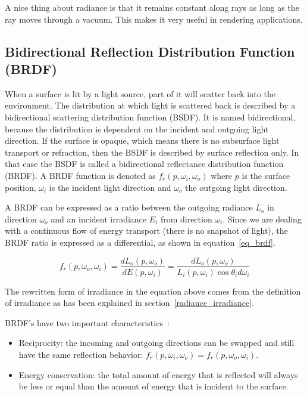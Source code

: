 \documentclass[11pt,a4paper]{report}
\begin{document}
A nice thing about radiance is that it remains constant along rays as long as the ray moves through a vacuum. This makes it very useful in rendering applications.

\subsection{Bidirectional Reflection Distribution Function (BRDF)}
\label{sec_bsdf}

When a surface is lit by a light source, part of it will scatter back into the environment. The distribution at which light is scattered back is described by a bidirectional scattering distribution function (BSDF). It is named bidirectional, because the distribution is dependent on the incident and outgoing light direction. If the surface is opaque, which means there is no subsurface light transport or refraction, then the BSDF is described by surface reflection only. In that case the BSDF is called a bidirectional reflectance distribution function (BRDF). A BRDF function is denoted as $f_r(p, \omega_i, \omega_o)$ where $p$ is the surface position, $\omega_i$ is the incident light direction and $\omega_o$ the outgoing light direction.

A BRDF can be expressed as a ratio between the outgoing radiance $L_o$ in direction $\omega_o$ and an incident irradiance $E_i$ from direction $\omega_i$. Since we are dealing with a continuous flow of energy transport (there is no snapshot of light), the BRDF ratio is expressed as a differential, as shown in equation~\ref{eq_brdf}.

\begin{equation}
f_r(p, \omega_o, \omega_i) = \frac{dL_o(p, \omega_o)}{dE(p,\omega_i)} = \frac{dL_o(p, \omega_o)}{L_i(p, \omega_i) \cos \theta_i d\omega_i}
\label{eq_brdf}
\end{equation}

The rewritten form of irradiance in the equation above comes from the definition of irradiance as has been explained in section~\ref{radiance_irradiance}.

BRDF's have two important characteristics~\cite{pharr2017}:

\begin{itemize}
\item Reciprocity: the incoming and outgoing directions can be swapped and still have the same reflection behavior: $f_r(p, \omega_i, \omega_o) = f_r(p, \omega_o, \omega_i)$.
\item Energy conservation: the total amount of energy that is reflected will always be less or equal than the amount of energy that is incident to the surface.
\end{itemize}
\end{document}
